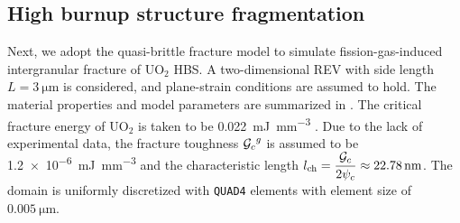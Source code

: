 \subsection{High burnup structure fragmentation}

Next, we adopt the quasi-brittle fracture model to simulate fission-gas-induced intergranular fracture of UO$_2$ HBS. A two-dimensional REV with side length $L = \SI{3}{\micro\meter}$ is considered, and plane-strain conditions are assumed to hold. The material properties and model parameters are summarized in . The critical fracture energy of UO$_2$ is taken to be \SI{0.022}{\milli\joule\per\cubic\milli\meter} \cite{oguma_1982}.
Due to the lack of experimental data, the fracture toughness ${\mathcal{G}_c}^g$ is assumed to be \SI{1.2e-6}{\milli\joule\per\cubic\milli\meter} and the characteristic length $l_\text{ch} = \dfrac{{\mathcal{G}_c}}{2\psi_c} \approx \SI{22.78}{\nano\meter}$. The domain is uniformly discretized with \texttt{QUAD4} elements with element size of $\SI{0.005}{\micro\meter}$.


